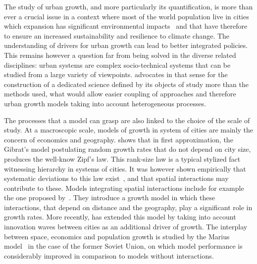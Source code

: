 \documentclass[10pt,letterpaper]{article}
\begin{document}
The study of urban growth, and more particularly its quantification, is more than ever a crucial issue in a context where most of the world population live in cities which expansion has significant environmental impacts~\cite{seto2012global} and that have therefore to ensure an increased sustainability and resilience to climate change. The understanding of drivers for urban growth can lead to better integrated policies. This remains however a question far from being solved in the diverse related disciplines: urban systems are complex socio-technical systems that can be studied from a large variety of viewpoints. \cite{batty2013new} advocates in that sense for the construction of a dedicated science defined by its objects of study more than the methods used, what would allow easier coupling of approaches and therefore urban growth models taking into account heterogeneous processes.

The processes that a model can grasp are also linked to the choice of the scale of study. At a macroscopic scale, models of growth in system of cities are mainly the concern of economics and geography. \cite{gabaix1999zipf} shows that in first approximation, the Gibrat's model postulating random growth rates that do not depend on city size, produces the well-know Zipf's law. This rank-size law is a typical stylized fact witnessing hierarchy in systems of cities. It was however shown empirically that systematic deviations to this law exist~\cite{rozenfeld2008laws}, and that spatial interactions may contribute to these. Models integrating spatial interactions include for example the one proposed by~\cite{bretagnolle2000long}. They introduce a growth model in which these interactions, that depend on distance and the geography, play a significant role in growth rates. More recently, \cite{favaro2011gibrat} has extended this model by taking into account innovation waves between cities as an additional driver of growth. The interplay between space, economics and population growth is studied by the Marius model~\cite{cottineau2014evolution} in the case of the former Soviet Union, on which model performance is considerably improved in comparison to models without interactions.
\end{document}
